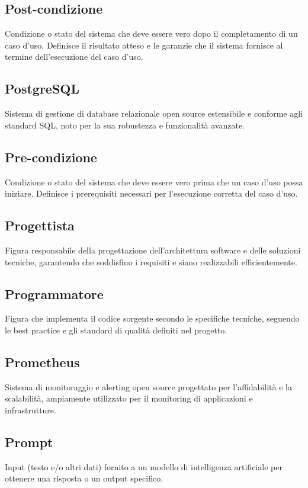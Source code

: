 \documentclass[a4paper,11pt]{article}
\begin{document}
\subsection{Post-condizione}
Condizione o stato del sistema che deve essere vero dopo il completamento di un caso d'uso. Definisce il risultato atteso e le garanzie che il sistema fornisce al termine dell'esecuzione del caso d'uso.

\subsection{PostgreSQL}
Sistema di gestione di database relazionale open source estensibile e conforme agli standard SQL, noto per la sua robustezza e funzionalità avanzate.

\subsection{Pre-condizione}
Condizione o stato del sistema che deve essere vero prima che un caso d'uso possa iniziare. Definisce i prerequisiti necessari per l'esecuzione corretta del caso d'uso.

\subsection{Progettista}
Figura responsabile della progettazione dell'architettura software e delle soluzioni tecniche, garantendo che soddisfino i requisiti e siano realizzabili efficientemente.

\subsection{Programmatore}
Figura che implementa il codice sorgente secondo le specifiche tecniche, seguendo le best practice e gli standard di qualità definiti nel progetto.

\subsection{Prometheus}
Sistema di monitoraggio e alerting open source progettato per l'affidabilità e la scalabilità, ampiamente utilizzato per il monitoring di applicazioni e infrastrutture.

\subsection{Prompt}
Input (testo e/o altri dati) fornito a un modello di intelligenza artificiale per ottenere una risposta o un output specifico.
\end{document}

